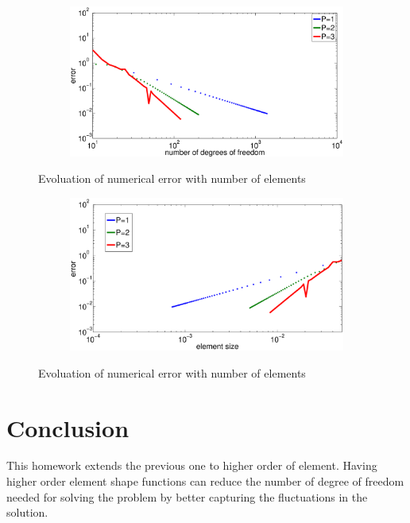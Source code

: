 \documentclass[paper=a4, fontsize=11pt]{article} %
\begin{document}
\begin{figure}
        \centering
        \begin{subfigure}[b]{0.8\textwidth}
                \includegraphics[width=\textwidth]{error_DOF.eps}
                \label{fig:e1}
        \end{subfigure}

        \caption{Evoluation of numerical error with number of elements}\label{fig:error}
\end{figure}

\begin{figure}
        \centering
        \begin{subfigure}[b]{0.8\textwidth}
                \includegraphics[width=\textwidth]{error_h.eps}
                \label{fig:e1}
        \end{subfigure}

        \caption{Evoluation of numerical error with number of elements}\label{fig:error}
\end{figure}

\section{Conclusion}

This homework extends the previous one to higher order of element. Having higher order element shape functions can reduce the number of degree of freedom needed for solving the problem by better capturing the fluctuations in the solution. 
\end{document}
